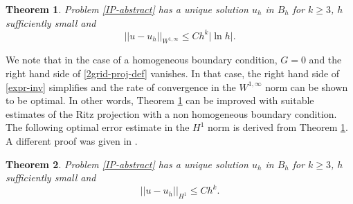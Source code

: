 \documentclass[12pt]{amsart}
\numberwithin{equation}{section}
\newtheorem{thm}{Theorem}[section]
\begin{document}
\begin{thm} \label{2grid-imp-thm}
Problem \eqref{IP-abstract} has a unique solution $u_h$ in $B_h$ for $k \geq 3$, $h$ sufficiently small and
$$||u-u_h||_{W^{1,\infty}} \leq C h^{k} |\ln h |.$$ %
\end{thm}
We note that in the case of a homogeneous boundary condition, $G=0$ and the right hand side of \eqref{2grid-proj-def} vanishes. In that case, the right hand side of \eqref{expr-inv} simplifies and the rate of convergence in the $W^{1,\infty}$ norm can be shown to be optimal. In other words, Theorem \ref{2grid-imp-thm} can be improved with suitable estimates of the Ritz projection with a non homogeneous boundary condition. 
The following optimal error estimate in the $H^1$ norm is derived from Theorem \ref{2grid-imp-thm}. A different proof was given in \cite{Brenner2010b}. 

\begin{thm}  \label{2grid-imp2-thm}
Problem \eqref{IP-abstract} has a unique solution $u_h$ in $B_h$ for $k \geq 3$, $h$ sufficiently small and
$$||u-u_h||_{H^{1}} \leq C h^{k}. $$
\end{thm}
\end{document}
